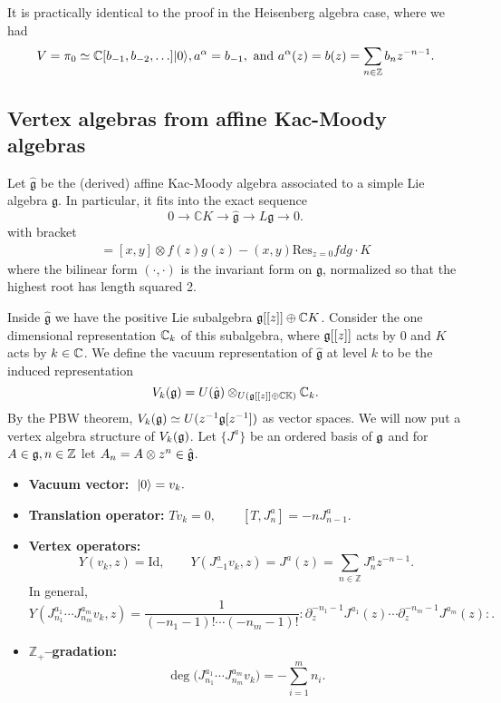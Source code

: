 \documentclass[12pt]{article}
\begin{document}
It is practically identical to the proof in the Heisenberg algebra case,
where we had \begin{align*}
    V=\pi_0\simeq\mathbb{C}[b_{-1},b_{-2},\ldots]\lvert 0 \rangle,
    a^\alpha=b_{-1}, \text{ and } a^\alpha(z)=b(z)=\sum_{n\in\mathbb{Z}} b_n z^{-n-1}.
\end{align*}

\subsection{Vertex algebras from affine Kac-Moody algebras}
Let $\hat{\mathfrak{g}}$ be the (derived) affine Kac-Moody algebra associated to a simple Lie algebra $\mathfrak{g}$. In particular, it fits into the exact sequence
\[0 \to \mathbb{C}K \to \hat{\mathfrak{g}} \to L\mathfrak{g} \to 0.\]
with bracket
\begin{align*}
    [x\otimes f(z), y\otimes g(z)] = [x,y]\otimes f(z)g(z) - (x,y)\mathrm{Res}_{z=0} f dg \cdot K
\end{align*} where the bilinear form $(\cdot,\cdot)$ is the invariant form on $\mathfrak{g}$, normalized so that the highest root has length squared 2.

Inside $\hat{\mathfrak{g}}$ we have the positive Lie subalgebra $\mathfrak{g}[[z]] \oplus \mathbb{C}K$. Consider the one dimensional representation $\mathbb{C}_k$ of this subalgebra, where $\mathfrak{g}[[z]]$ acts by 0 and $K$ acts by $k\in\mathbb{C}$. We define the vacuum representation of $\hat{\mathfrak{g}}$ at level $k$ to be the induced representation
\[V_k(\mathfrak{g}) = U(\hat{\mathfrak{g}}) \otimes_{U(\mathfrak{g}[[z]] \oplus \mathbb{CK})} \mathbb{C}_k.\]
By the PBW theorem, $V_k(\mathfrak{g}) \simeq U(z^{-1}\mathfrak g[z^{-1}])$ as vector spaces. We will now put a vertex algebra structure of $V_k(\mathfrak{g})$. Let $\{J^a\}$ be an ordered basis of $\mathfrak{g}$ and for $A\in \mathfrak{g}, n\in \mathbb{Z}$ let $A_n = A\otimes z^n \in \hat{\mathfrak{g}}$.
\begin{itemize}
    \item \textbf{Vacuum vector:} $\;\lvert 0 \rangle=v_k.$
    \item \textbf{Translation operator:} $T v_k = 0,\qquad [T, J^a_n] = -n J^a_{n-1}.$
\end{itemize}

\begin{itemize}
    \item \textbf{Vertex operators:}
          \[
              Y(v_k,z) = \mathrm{Id},\qquad
              Y(J^a_{-1} v_k, z) = J^a(z) = \sum_{n\in\mathbb{Z}} J^a_n z^{-n-1}.
          \]
          In general,
          \begin{equation}\label{2.4.5}
              Y(J^{a_1}_{n_1}\cdots J^{a_m}_{n_m} v_k, z)
              = \frac{1}{(-n_1-1)!\cdots(-n_m-1)!}
              :\partial_z^{-n_1-1} J^{a_1}(z)\cdots \partial_z^{-n_m-1} J^{a_m}(z):.
          \end{equation}

    \item \textbf{$\mathbb{Z}_+$–gradation:}
          \[
              \deg\!\big(J^{a_1}_{n_1}\cdots J^{a_m}_{n_m} v_k\big)
              = -\sum_{i=1}^m n_i.
          \]
\end{itemize}
\end{document}
